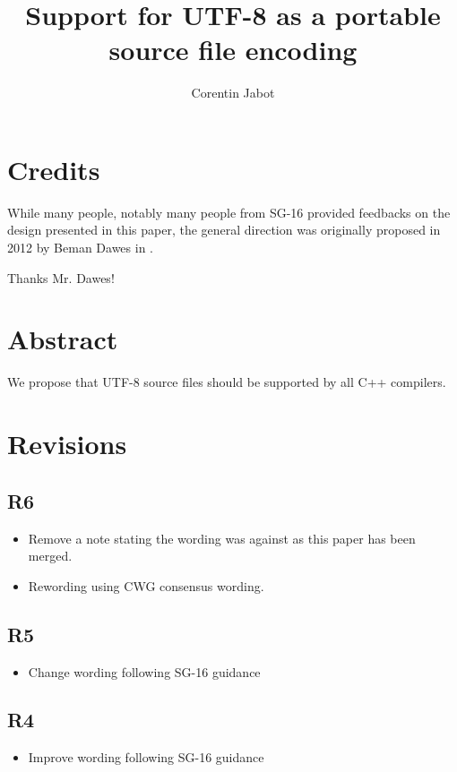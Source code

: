 \documentclass{wg21}
\title{Support for UTF-8 as a portable source file encoding}
\author{Corentin Jabot}{corentin.jabot@gmail.com}
\begin{document}
\maketitle


\section{Credits}

While many people, notably many people from SG-16 provided feedbacks on the design presented in this paper,
the general direction was originally proposed in 2012 by Beman Dawes in .

Thanks Mr. Dawes!

\section{Abstract}

We propose that UTF-8 source files should be supported by all C++ compilers.

\section{Revisions}

\subsection{R6}
\begin{itemize}
    \item Remove a note stating the wording was against  as this paper has been merged.
    \item Rewording using CWG consensus wording.
\end{itemize}

\subsection{R5}
\begin{itemize}
    \item Change wording following SG-16 guidance
\end{itemize}

\subsection{R4}
\begin{itemize}
    \item Improve wording following SG-16 guidance
\end{itemize}
\end{document}
